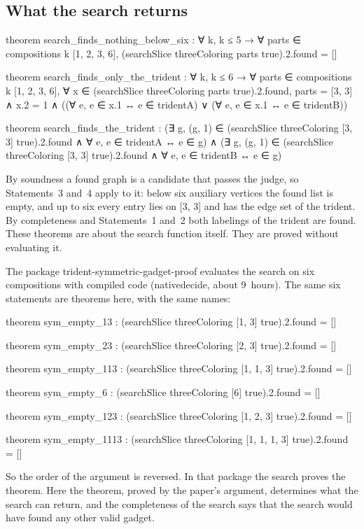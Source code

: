 \documentclass[11pt,a4paper]{article}
\newcommand{\leanus}{\textunderscore\allowbreak}
\newcommand{\lean}[1]{{\ttfamily\let\_\leanus #1}}
\begin{document}
\subsection{What the search returns}
\begin{code}
theorem search_finds_nothing_below_six :
    ∀ k, k ≤ 5 → ∀ parts ∈ compositions k [1, 2, 3, 6],
      (searchSlice threeColoring parts true).2.found = []

theorem search_finds_only_the_trident :
    ∀ k, k ≤ 6 → ∀ parts ∈ compositions k [1, 2, 3, 6],
      ∀ x ∈ (searchSlice threeColoring parts true).2.found,
        parts = [3, 3] ∧ x.2 = 1 ∧
          ((∀ e, e ∈ x.1 ↔ e ∈ tridentA) ∨ (∀ e, e ∈ x.1 ↔ e ∈ tridentB))

theorem search_finds_the_trident :
    (∃ g, (g, 1) ∈ (searchSlice threeColoring [3, 3] true).2.found ∧
      ∀ e, e ∈ tridentA ↔ e ∈ g) ∧
    (∃ g, (g, 1) ∈ (searchSlice threeColoring [3, 3] true).2.found ∧
      ∀ e, e ∈ tridentB ↔ e ∈ g)
\end{code}
By soundness a found graph is a candidate that passes the judge, so
Statements~3 and~4 apply to it: below six auxiliary vertices the found list
is empty, and up to six every entry lies on \lean{[3, 3]} and has the edge
set of the trident. By completeness and Statements~1 and~2 both labelings of
the trident are found. These theorems are about the search function itself.
They are proved without evaluating it.

The package \lean{trident-symmetric-gadget-proof} evaluates the search on six
compositions with compiled code (\lean{native\_decide}, about 9~hours).
The same six statements are theorems here, with the same names:
\begin{code}
theorem sym_empty_13 : (searchSlice threeColoring [1, 3] true).2.found = []

theorem sym_empty_23 : (searchSlice threeColoring [2, 3] true).2.found = []

theorem sym_empty_113 : (searchSlice threeColoring [1, 1, 3] true).2.found = []

theorem sym_empty_6 : (searchSlice threeColoring [6] true).2.found = []

theorem sym_empty_123 : (searchSlice threeColoring [1, 2, 3] true).2.found = []

theorem sym_empty_1113 : (searchSlice threeColoring [1, 1, 1, 3] true).2.found = []
\end{code}
So the order of the argument is reversed. In that package the search proves
the theorem. Here the theorem, proved by the paper's argument,
determines what the search can return, and the completeness of the search
says that the search would have found any other valid gadget.
\end{document}
